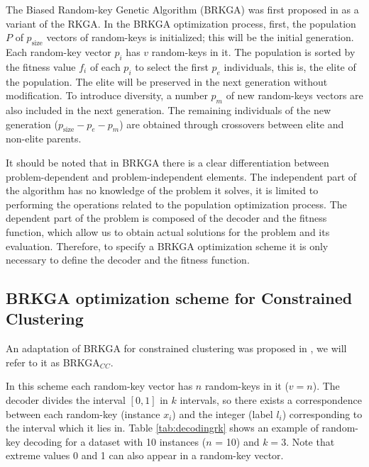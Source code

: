 \documentclass[review]{elsarticle}
\begin{document}
The Biased Random-key Genetic Algorithm (BRKGA) was first proposed in \cite{gonccalves2011biased} as a variant of the RKGA. In the BRKGA optimization process, first, the population $P$ of $p_\text{size}$ vectors of random-keys is initialized; this will be the initial generation. Each random-key vector $p_i$ has $v$ random-keys in it. The population is sorted by the fitness value $f_i$ of each $p_i$ to select the first $p_e$ individuals, this is, the elite of the population. The elite will be preserved in the next generation without modification. To introduce diversity, a number $p_m$ of new random-keys vectors are also included in the next generation. The remaining individuals of the new generation ($p_\text{size} - p_e - p_m$) are obtained through crossovers between elite and non-elite parents.

It should be noted that in BRKGA there is a clear differentiation between problem-dependent and problem-independent elements. The independent part of the algorithm has no knowledge of the problem it solves, it is limited to performing the operations related to the population optimization process. The dependent part of the problem is composed of the decoder and the fitness function, which allow us to obtain actual solutions for the problem and its evaluation. Therefore, to specify a BRKGA optimization scheme it is only necessary to define the decoder and the fitness function. \cite{gonccalves2011biased}

\subsection{BRKGA optimization scheme for Constrained Clustering} \label{sec:AdaptationofBRKGA}

An adaptation of BRKGA for constrained clustering was proposed in \cite{de2017comparison}, we will refer to it as BRKGA$_{CC}$.

In this scheme each random-key vector has $n$ random-keys in it ($v = n$). The decoder divides the interval $[0,1]$ in $k$ intervals, so there exists a correspondence between each random-key (instance $x_i$) and the integer (label $l_i$) corresponding to the interval which it lies in. Table \ref{tab:decodingrk} shows an example of random-key decoding for a dataset with 10 instances ($n$ = 10) and $k = 3$. Note that extreme values 0 and 1 can also appear in a random-key vector.
\end{document}
